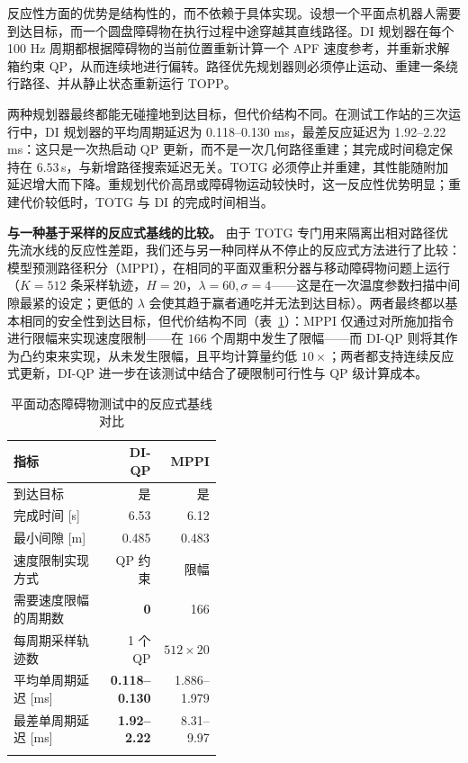 反应性方面的优势是结构性的，而不依赖于具体实现。设想一个平面点机器人需要到达目标，而一个圆盘障碍物在执行过程中途穿越其直线路径。DI 规划器在每个 100 Hz 周期都根据障碍物的当前位置重新计算一个 APF 速度参考，并重新求解箱约束 QP，从而连续地进行偏转。路径优先规划器则必须停止运动、重建一条绕行路径、并从静止状态重新运行 TOPP。

两种规划器最终都能无碰撞地到达目标，但代价结构不同。在测试工作站的三次运行中，DI 规划器的平均周期延迟为 0.118--0.130 ms，最差反应延迟为 1.92--2.22 ms：这只是一次热启动 QP 更新，而不是一次几何路径重建；其完成时间稳定保持在 \(6.53\)\,s，与新增路径搜索延迟无关。TOTG 必须停止并重建，其性能随附加延迟增大而下降。重规划代价高昂或障碍物运动较快时，这一反应性优势明显；重建代价较低时，TOTG 与 DI 的完成时间相当。

\textbf{与一种基于采样的反应式基线的比较。} 由于 TOTG 专门用来隔离出相对路径优先流水线的反应性差距，我们还与另一种同样从不停止的反应式方法进行了比较：模型预测路径积分（MPPI）\cite{williams2017}，在相同的平面双重积分器与移动障碍物问题上运行（\(K{=}512\) 条采样轨迹，\(H{=}20\)，\(\lambda{=}60,\sigma{=}4\)——这是在一次温度参数扫描中间隙最紧的设定；更低的 \(\lambda\) 会使其趋于赢者通吃并无法到达目标）。两者最终都以基本相同的安全性到达目标，但代价结构不同（表~\ref{tab:mppi-compare}）：MPPI 仅通过对所施加指令进行限幅来实现速度限制——在 \(166\) 个周期中发生了限幅——而 DI-QP 则将其作为凸约束来实现，从未发生限幅，且平均计算量约低 \(10\times\)；两者都支持连续反应式更新，DI-QP 进一步在该测试中结合了硬限制可行性与 QP 级计算成本。

{%
\begin{table}[t]
\caption{平面动态障碍物测试中的反应式基线对比}
\label{tab:mppi-compare}
\centering
\footnotesize
\setlength{\tabcolsep}{4pt}
\begin{tabular}{@{}>{\raggedright\arraybackslash}p{0.46\linewidth}rr@{}}
\toprule\noalign{}
指标 & DI-QP & MPPI \\
\midrule\noalign{}
到达目标 & 是 & 是 \\
完成时间 {[}s{]} & 6.53 & 6.12 \\
最小间隙 {[}m{]} & 0.485 & 0.483 \\
速度限制实现方式 & QP 约束 & 限幅 \\
需要速度限幅的周期数 & \textbf{0} & 166 \\
每周期采样轨迹数 & 1 个 QP & \(512\times20\) \\
平均单周期延迟 {[}ms{]} & \textbf{0.118--0.130} & 1.886--1.979 \\
最差单周期延迟 {[}ms{]} & \textbf{1.92--2.22} & 8.31--9.97 \\
\bottomrule\noalign{}
\end{tabular}
\end{table}
}

